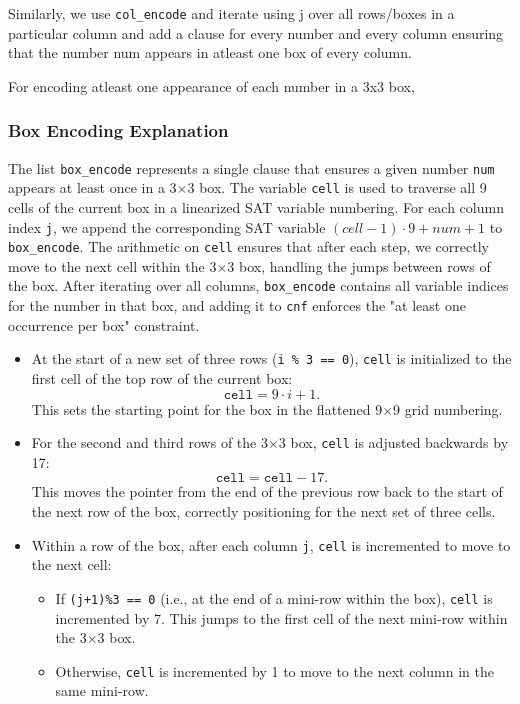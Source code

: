 \documentclass[12pt,a4paper]{article}
\begin{document}
Similarly, we use \texttt{col\_encode} and iterate using j over all rows/boxes in a particular column and add a clause for every number and every column ensuring that the number num appears in atleast one box of every column.

For encoding atleast one appearance of each number in a 3x3 box,

\subsubsection*{Box Encoding Explanation}

The list \texttt{box\_encode} represents a single clause that ensures a given number \texttt{num} appears at least once in a 3$\times$3 box. The variable \texttt{cell} is used to traverse all 9 cells of the current box in a linearized SAT variable numbering. For each column index \texttt{j}, we append the corresponding SAT variable 
\(
(cell-1) \cdot 9 + num + 1
\) 
to \texttt{box\_encode}. The arithmetic on \texttt{cell} ensures that after each step, we correctly move to the next cell within the 3$\times$3 box, handling the jumps between rows of the box. After iterating over all columns, \texttt{box\_encode} contains all variable indices for the number in that box, and adding it to \texttt{cnf} enforces the "at least one occurrence per box" constraint.



\begin{itemize}
    \item At the start of a new set of three rows (\texttt{i \% 3 == 0}), \texttt{cell} is initialized to the first cell of the top row of the current box: 
    \[
        \texttt{cell} = 9 \cdot i + 1.
    \]
    This sets the starting point for the box in the flattened 9$\times$9 grid numbering.
    
    \item For the second and third rows of the 3$\times$3 box, \texttt{cell} is adjusted backwards by 17: 
    \[
        \texttt{cell} = \texttt{cell} - 17.
    \]
    This moves the pointer from the end of the previous row back to the start of the next row of the box, correctly positioning for the next set of three cells.
    
    \item Within a row of the box, after each column \texttt{j}, \texttt{cell} is incremented to move to the next cell:
    \begin{itemize}
        \item If \texttt{(j+1)\%3 == 0} (i.e., at the end of a mini-row within the box), \texttt{cell} is incremented by 7. This jumps to the first cell of the next mini-row within the 3$\times$3 box.
        \item Otherwise, \texttt{cell} is incremented by 1 to move to the next column in the same mini-row.
    \end{itemize}
\end{itemize}
\end{document}
